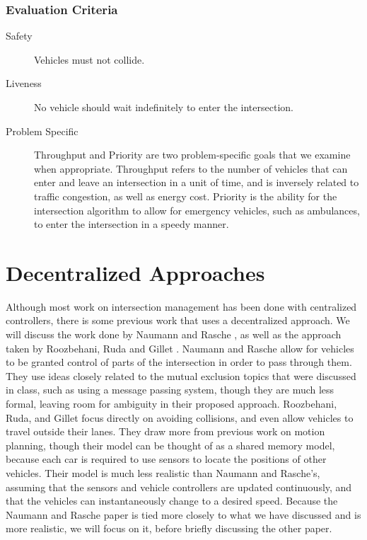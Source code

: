\documentclass[12pt]{article}
\begin{document}
\subsubsection{Evaluation Criteria}

\begin{description}
\item[Safety] Vehicles must not collide.  
\item[Liveness] No vehicle should wait indefinitely to enter the intersection.
\item[Problem Specific]
Throughput and Priority are two problem-specific goals that we examine when appropriate. Throughput refers to the number of vehicles that can enter and leave an intersection in a unit of time, and is inversely related to traffic congestion, as well as energy cost. Priority is the ability for the intersection algorithm to allow for emergency vehicles, such as ambulances, to enter the intersection in a speedy manner.
\end{description}

\section{Decentralized Approaches}
\label{sec:decentralizedApproaches}
Although most work on intersection management has been done with centralized controllers, there is some previous work that uses a decentralized approach. We will discuss the work done by Naumann and Rasche \cite{naumann}, as well as the approach taken by Roozbehani, Ruda and Gillet \cite{roozbehani}. Naumann and Rasche allow for vehicles to be granted control of parts of the intersection in order to pass through them. They use ideas closely related to the mutual exclusion topics that were discussed in class, such as using a message passing system, though they are much less formal, leaving room for ambiguity in their proposed approach. Roozbehani, Ruda, and Gillet focus directly on avoiding collisions, and even allow vehicles to travel outside their lanes. They draw more from previous work on motion planning, though their model can be thought of as a shared memory model, because each car is required to use sensors to locate the positions of other vehicles. Their model is much less realistic than Naumann and Rasche's, assuming that the sensors and vehicle controllers are updated continuously, and that the vehicles can instantaneously change to a desired speed. Because the Naumann and Rasche paper is tied more closely to what we have discussed and is more realistic, we will focus on it, before briefly discussing the other paper. 
\end{document}

